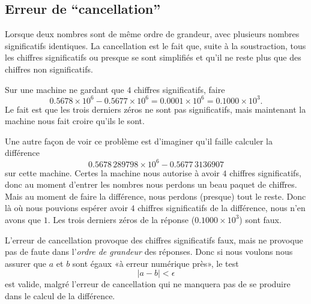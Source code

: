 \subsection{Erreur de ``cancellation''}

Lorsque deux nombres sont de même ordre de grandeur, avec plusieurs nombres significatifs identiques. La cancellation est le fait que, suite à la soustraction, tous les chiffres significatifs ou presque se sont simplifiés et qu'il ne reste plus que des chiffres non significatifs.

\begin{example}
	Sur une machine ne gardant que \( 4\) chiffres significatifs, faire
	\begin{equation}
		0.5678\times 10^6-0.5677\times 10^6 = 0.0001\times 10^6=0.1000\times 10^3.
	\end{equation}
	Le fait est que les trois derniers zéros ne sont pas significatifs, mais maintenant la machine nous fait croire qu'ils le sont.

	Une autre façon de voir ce problème est d'imaginer qu'il faille calculer la différence
	\begin{equation}
		0.5678\,289798\times 10^6 - 0.5677\,3136907
	\end{equation}
	sur cette machine. Certes la machine nous autorise à avoir \( 4\) chiffres significatifs, donc au moment d'entrer les nombres nous perdons un beau paquet de chiffres. Mais au moment de faire la différence, nous perdons (presque) tout le reste. Donc là où nous pouvions espérer avoir \( 4\) chiffres significatifs de la différence, nous n'en avons que \( 1\). Les trois derniers zéros de la réponse (\( 0.1000\times 10^3\)) sont faux.
\end{example}

\begin{remark}  \label{REMooRQIJooNLdAZE}
	L'erreur de cancellation provoque des chiffres significatifs faux, mais ne provoque pas de faute dans l'\emph{ordre de grandeur} des réponses. Donc si nous voulons nous assurer que \( a\) et \( b\) sont égaux «à erreur numérique près», le test
	\begin{equation}
		| a-b |<\epsilon
	\end{equation}
	est valide, malgré l'erreur de cancellation qui ne manquera pas de se produire dans le calcul de la différence.
\end{remark}

